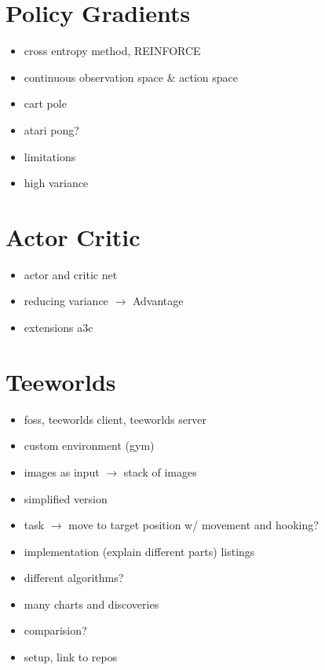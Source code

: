 \documentclass[11pt]{scrartcl}
\begin{document}
\section{Policy Gradients}
\begin{itemize}
\item cross entropy method, REINFORCE
\item continuous observation space \& action space
\item cart pole
\item atari pong?
\item limitations
\item high variance
\end{itemize}

\section{Actor Critic}
\begin{itemize}
\item actor and critic net
\item reducing variance $\rightarrow$ Advantage
\item extensions a3c
\end{itemize}

\section{Teeworlds}
\begin{itemize}
\item foss, teeworlds client, teeworlds server
\item custom environment (gym)
\item images as input $\rightarrow$ stack of images
\item simplified version
\item task $\rightarrow$ move to target position w/ movement and hooking?
\item implementation (explain different parts) listings
\item different algorithms?
\item many charts and discoveries
\item comparision?
\item setup, link to repos
\end{itemize}

\newpage


\newpage
\listoffigures 
\listoftables 
\end{document}
